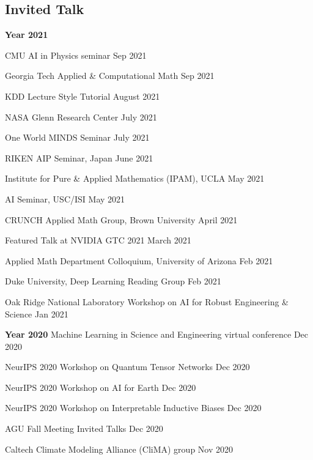 \documentclass[margin,line]{res}
\begin{document}
\begin{resume}





\section{\sc Invited Talk}
 {\bf Year  2021}

 
 CMU AI in Physics seminar \hfill{Sep 2021}
 
 Georgia Tech Applied \& Computational Math \hfill{Sep 2021}

 KDD Lecture Style Tutorial \hfill{August 2021}
 

 
NASA Glenn Research Center \hfill{July 2021}
 
One World MINDS Seminar \hfill{July 2021}

RIKEN AIP Seminar, Japan  \hfill{June 2021}
  
Institute for Pure \& Applied Mathematics (IPAM), UCLA \hfill{May 2021}

AI Seminar, USC/ISI \hfill{May 2021}

CRUNCH Applied Math Group,  Brown University \hfill{April 2021}
 
 Featured Talk at NVIDIA GTC 2021   \hfill{March 2021}
  
 Applied Math Department Colloquium, University of Arizona   \hfill{Feb 2021}
  
 Duke University, Deep Learning Reading Group \hfill{Feb 2021}

Oak Ridge National Laboratory Workshop on AI for Robust Engineering \& Science \hfill{Jan 2021}

 {\bf Year  2020}
Machine Learning in Science and Engineering virtual conference \hfill{Dec 2020}


NeurIPS 2020 Workshop on Quantum Tensor Networks \hfill{Dec 2020}

NeurIPS 2020 Workshop on AI for Earth \hfill{Dec 2020}

NeurIPS 2020 Workshop on Interpretable Inductive Biases \hfill{Dec 2020}

AGU Fall Meeting Invited Talks \hfill{Dec 2020}

Caltech Climate Modeling Alliance (CliMA) group  \hfill{Nov 2020}


\end{resume}
\end{document}
